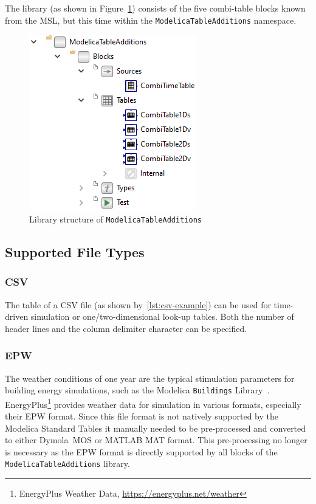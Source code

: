 \documentclass{modelica}
\newcommand{\modelica}[1]{\lstinline[language=modelica]|#1|}
\begin{document}
The library (as shown in Figure~\ref{fig:ModelicaTableAdditions}) consists of the five combi-table blocks known from the MSL, but this time within the \modelica{ModelicaTableAdditions} namespace.

\begin{figure}[!ht]
\centering
\includegraphics[scale=0.8]{resources/ModelicaTableAdditions.png}
\caption{Library structure of \modelica{ModelicaTableAdditions}}
\label{fig:ModelicaTableAdditions}
\end{figure}

\subsection{Supported File Types}

\subsubsection{CSV}

The table of a CSV file (as shown by~\autoref{lst:csv-example}) can be used for time-driven simulation or one/two-dimensional look-up tables.
Both the number of header lines and the column delimiter character can be specified.

\subsubsection{EPW}

The weather conditions of one year are the typical stimulation parameters for building energy simulations, such as the Modelica \modelica{Buildings} Library~\cite{buildings}.
EnergyPlus\footnote{EnergyPlus Weather Data, \url{https://energyplus.net/weather}} provides weather data for simulation in various formats, especially their EPW format.
Since this file format is not natively supported by the Modelica Standard Tables it manually needed to be pre-processed and converted to either Dymola~MOS or MATLAB MAT format.
This pre-processing no longer is necessary as the EPW format is directly supported by all blocks of the \modelica{ModelicaTableAdditions} library.
\end{document}
